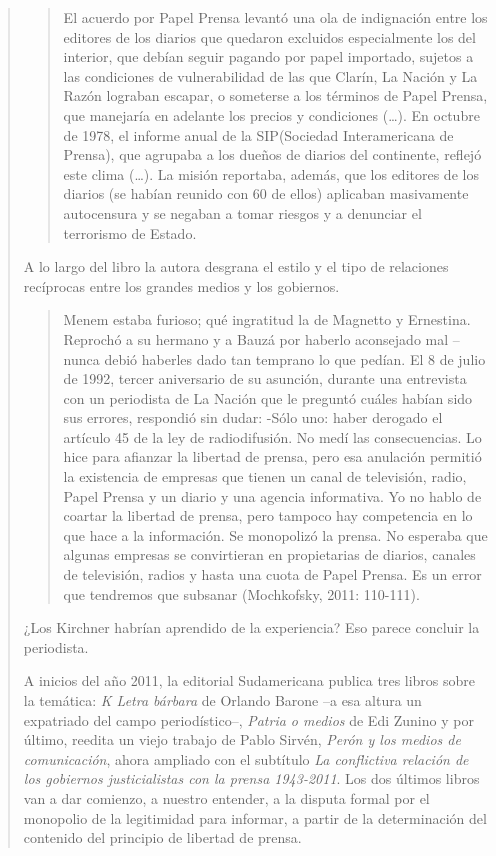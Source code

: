 {\begin{quote}
\begin{quote}
El acuerdo por Papel Prensa levantó una ola de indignación entre los editores de los diarios que quedaron excluidos especialmente los del interior, que debían seguir pagando por papel importado, sujetos a las condiciones de vulnerabilidad de las que Clarín, La Nación y La Razón lograban escapar, o someterse a los términos de Papel Prensa, que manejaría en adelante los precios y condiciones (\ldots). En octubre de 1978, el informe anual de la SIP(Sociedad Interamericana de Prensa), que agrupaba a los dueños de diarios del continente, reflejó este clima (\ldots). La misión reportaba, además, que los editores de los diarios (se habían reunido con 60 de ellos) aplicaban masivamente autocensura y se negaban a tomar riesgos y a denunciar el terrorismo de Estado.
\end{quote}

A lo largo del libro la autora desgrana el estilo y el tipo de relaciones recíprocas entre los grandes medios y los gobiernos.

\begin{quote}
Menem estaba furioso; qué ingratitud la de Magnetto y Ernestina. Reprochó a su hermano y a Bauzá por haberlo aconsejado mal -- nunca debió haberles dado tan temprano lo que pedían. El 8 de julio de 1992, tercer aniversario de su asunción, durante una entrevista con un periodista de La Nación que le preguntó cuáles habían sido sus errores, respondió sin dudar: -Sólo uno: haber derogado el artículo 45 de la ley de radiodifusión. No medí las consecuencias. Lo hice para afianzar la libertad de prensa, pero esa anulación permitió la existencia de empresas que tienen un canal de televisión, radio, Papel Prensa y un diario y una agencia informativa. Yo no hablo de coartar la libertad de prensa, pero tampoco hay competencia en lo que hace a la información. Se monopolizó la prensa. No esperaba que algunas empresas se convirtieran en propietarias de diarios, canales de televisión, radios y hasta una cuota de Papel Prensa. Es un error que tendremos que subsanar (Mochkofsky, 2011: 110-111).
\end{quote}

¿Los Kirchner habrían aprendido de la experiencia? Eso parece concluir la periodista.

A inicios del año 2011, la editorial Sudamericana publica tres libros sobre la temática: \emph{K Letra bárbara} de Orlando Barone --a esa altura un expatriado del campo periodístico--, \emph{Patria o medios} de Edi Zunino y por último, reedita un viejo trabajo de Pablo Sirvén, \emph{Perón y los medios de comunicación}, ahora ampliado con el subtítulo \emph{La conflictiva relación de los gobiernos justicialistas con la prensa 1943-2011}. Los dos últimos libros van a dar comienzo, a nuestro entender, a la disputa formal por el monopolio de la legitimidad para informar, a partir de la determinación del contenido del principio de libertad de prensa.


\end{quote}}
